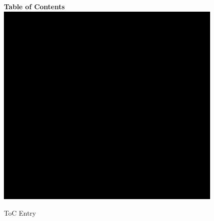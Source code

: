 \documentclass{WileyMSP-template}
\begin{document}


\begin{figure}
\textbf{Table of Contents}\\
\medskip
  \includegraphics{toc-image.png}
  \medskip
  \caption*{ToC Entry}
\end{figure}
\end{document}
